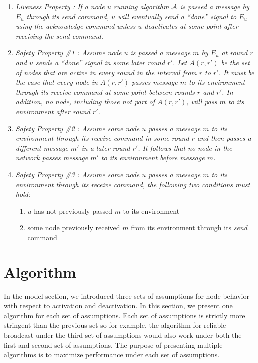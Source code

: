\documentclass[english]{article}
\begin{document}
\begin {enumerate}
 
  \item \em Liveness Property \em: If a node $u$ running algorithm $\cal A$ is passed a message by $E_u$ through its \textit{send} command, $u$ will eventually send  a ``done'' signal to $E_u$ using the \textit{acknowledge} command unless $u$ deactivates at some point after receiving the \textit{send} command.

  \item \em Safety Property \#1 \em: Assume node $u$ is passed a message $m$ by $E_u$ at round $r$ and $u$ sends  a ``done'' signal in some later round $r'$. Let $A(r,r')$ be the set of nodes that are active in every round in the interval from $r$ to $r'$. It must be the case that every node in $A(r,r')$ passes message $m$ to its environment through its \textit{receive} command at some point between rounds $r$ and $r'$. In addition, no node, including those not part of $A(r,r')$, will pass $m$ to its environment after round $r'$. 

  \item \em Safety Property \#2 \em: Assume some node $u$ passes a message $m$ to its environment through its \textit{receive} command in some round $r$ and then passes a different message $m'$ in a later round $r'$. It follows that no node in the network passes message $m'$ to its environment before message $m$. 

  \item \em Safety Property \#3 \em: Assume some node $u$ passes a message $m$ to its environment through its \textit{receive} command, the following two conditions must hold:
  \begin {enumerate}
    \item $u$ has not previously passed $m$ to its environment
    \item some node previously received $m$ from its environment through its \textit{send} command
  \end{enumerate}

\end{enumerate}


\section{Algorithm}

In the model section, we introduced three sets of assumptions for node behavior with respect to activation and deactivation. In this section, we present one algorithm for each set of assumptions. Each set of assumptions is strictly more stringent than the previous set so for example, the algorithm for reliable broadcast under the third set of assumptions would also work under both the first and second set of assumptions. The purpose of presenting multiple algorithms is to maximize performance under each set of assumptions.
\end{document}
